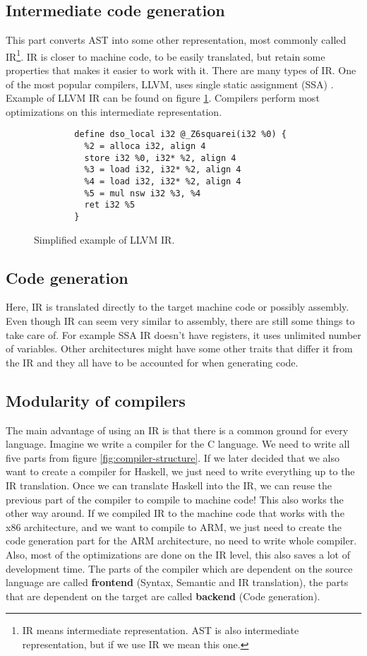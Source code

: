 \subsection{Intermediate code generation}
This part converts AST into some other representation, most commonly called IR\footnote{IR means intermediate representation.
AST is also intermediate representation, but if we use IR we mean this one.}. IR is closer to machine code, to be easily translated,
but retain some properties that makes it easier to work with it. There are many types of IR. One of the most popular compilers, LLVM, uses
single static assignment (SSA) \cite{llvm}. Example of LLVM IR can be found on figure \ref{fig:llvm-ir-example}. Compilers perform most
optimizations on this intermediate representation. 

\begin{figure}\label{fig:llvm-ir-example}
    \begin{verbatim}
        define dso_local i32 @_Z6squarei(i32 %0) {
          %2 = alloca i32, align 4
          store i32 %0, i32* %2, align 4
          %3 = load i32, i32* %2, align 4
          %4 = load i32, i32* %2, align 4
          %5 = mul nsw i32 %3, %4
          ret i32 %5
        }
    \end{verbatim}
    \caption{Simplified example of LLVM IR.}
\end{figure}

\subsection{Code generation}
Here, IR is translated directly to the target machine code or possibly assembly. Even though IR can seem very similar to assembly,
there are still some things to take care of. For example SSA IR doesn't have registers, it uses unlimited number of variables.
Other architectures might have some other traits that differ it from the IR and they all have to be accounted for when generating code.

\subsection{Modularity of compilers}
The main advantage of using an IR is that there is a common ground for every language. Imagine we write a compiler for the C language.
We need to write all five parts from figure \ref{fig:compiler-structure}. If we later decided that we also want to create a compiler
for Haskell, we just need to write everything up to the IR translation. Once we can translate Haskell into the IR, we can reuse the
previous part of the compiler to compile to machine code! This also works the other way around. If we compiled IR to the machine code
that works with the x86 architecture, and we want to compile to ARM, we just need to create the code generation part for the ARM architecture,
no need to write whole compiler. Also, most of the optimizations are done on the IR level, this also saves a lot of development time.
The parts of the compiler which are dependent on the source language are called \textbf{frontend} (Syntax, Semantic and IR translation), the parts that are dependent on
the target are called \textbf{backend} (Code generation).

